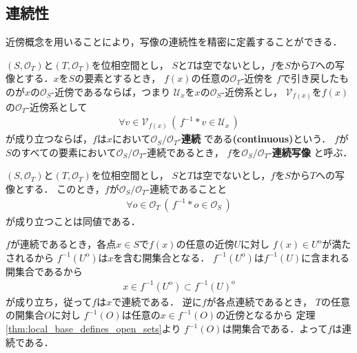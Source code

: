 \subsection{連続性}
	近傍概念を用いることにより，写像の連続性を精密に定義することができる．
	
	\begin{screen}
		\begin{dfn}[連続]
			$(S,\mathscr{O}_{T})$と$(T,\mathscr{O}_{T})$を位相空間とし，
			$S$と$T$は空でないとし，$f$を$S$から$T$への写像とする．$x$を$S$の要素とするとき，
			$f(x)$の任意の$\mathscr{O}_{T}$-近傍を
			$f$で引き戻したものが$x$の$\mathscr{O}_{S}$-近傍であるならば，つまり
			$\mathcal{U}_{x}$を$x$の$\mathscr{O}_{S}$-近傍系とし，
			$\mathcal{V}_{f(x)}$を$f(x)$の$\mathscr{O}_{T}$-近傍系として
			\begin{align}
				\forall v \in \mathcal{V}_{f(x)}\,
				\left(\, f^{-1} \ast v \in \mathcal{U}_{x}\, \right)
			\end{align}
			が成り立つならば，$f$は$x$において$\mathscr{O}_{S}/\mathscr{O}_{T}$-{\bf 連続}
			である{\bf (continuous)}という．
			$f$が$S$のすべての要素において$\mathscr{O}_{S}/\mathscr{O}_{T}$-連続であるとき，
			$f$を$\mathscr{O}_{S}/\mathscr{O}_{T}$-{\bf 連続写像}
			と呼ぶ．
		\end{dfn}
	\end{screen}
	
	\begin{screen}
		\begin{thm}[連続写像は開集合を開集合に引き戻す]
		\label{thm:continuous_iff_preimage_of_open_sets_are_open}
		\label{thm:continuous_on_every_point_iff_continuous}
			$(S,\mathscr{O}_{T})$と$(T,\mathscr{O}_{T})$を位相空間とし，
			$S$と$T$は空でないとし，$f$を$S$から$T$への写像とする．
			このとき，$f$が$\mathscr{O}_{S}/\mathscr{O}_{T}$-連続であることと
			\begin{align}
				\forall o \in \mathscr{O}_{T}\, 
				\left(\, f^{-1} \ast o \in \mathscr{O}_{S}\, \right)
			\end{align}
			が成り立つことは同値である．
		\end{thm}
	\end{screen}
	
	\begin{prf}
		$f$が連続であるとき，各点$x \in S$で$f(x)$の任意の近傍$U$に対し
		$f(x) \in U^{\mathrm{o}}$が満たされるから
		$f^{-1}(U^{\mathrm{o}})$は$x$を含む開集合となる．
		$f^{-1}(U^{\mathrm{o}})$は$f^{-1}(U)$に含まれる開集合であるから
		\begin{align}
			x \in f^{-1}(U^{\mathrm{o}}) \subset f^{-1}(U)^{\mathrm{o}}
		\end{align}
		が成り立ち，従って$f$は$x$で連続である．
		逆に$f$が各点連続であるとき，
		$T$の任意の開集合$O$に対し
		$f^{-1}(O)$は任意の$x \in f^{-1}(O)$の近傍となるから
		定理\ref{thm:local_base_defines_open_sets}より
		$f^{-1}(O)$は開集合である．よって$f$は連続である．
		\QED
	\end{prf}
	
